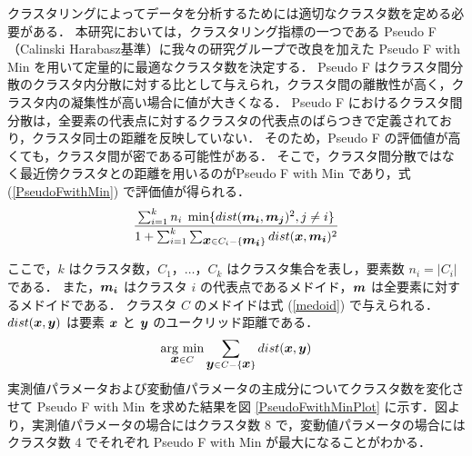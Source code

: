 \documentclass[technicalreport]{ieicej}
\begin{document}
クラスタリングによってデータを分析するためには適切なクラスタ数を定める必要がある．
本研究においては，クラスタリング指標の一つである Pseudo F（Calinski Harabasz基準）\cite{liu2010understanding}に我々の研究グループで改良を加えた Pseudo F with Min\cite{kanajiri} を用いて定量的に最適なクラスタ数を決定する．
Pseudo F はクラスタ間分散のクラスタ内分散に対する比として与えられ，クラスタ間の離散性が高く，クラスタ内の凝集性が高い場合に値が大きくなる．
Pseudo F におけるクラスタ間分散は，全要素の代表点に対するクラスタの代表点のばらつきで定義されており，クラスタ同士の距離を反映していない．
そのため，Pseudo F の評価値が高くても，クラスタ間が密である可能性がある．
そこで，クラスタ間分散ではなく最近傍クラスタとの距離を用いるのがPseudo F with Min であり，式 (\ref{PseudoFwithMin}) で評価値が得られる．
\begin{equation}
\frac{\sum^k_{i=1} n_{i}\hspace{0.1cm} \min \{ dist(\mbox{\boldmath $m_{i}$},\mbox{\boldmath $m_j$})^2,j \neq i \}}{1 + \sum^k_{i=1} \sum_{\mbox{\boldmath $x$} \in C_i - \{\mbox{\boldmath $m_i$}\}} dist(\mbox{\boldmath $x$},\mbox{\boldmath $m_{i}$})^2}
\label{PseudoFwithMin}
\end{equation}

ここで，$k$ はクラスタ数，$C_1，\ldots，C_k$ はクラスタ集合を表し，要素数 $n_i=|C_i|$ である．
また，$\mbox{\boldmath $m_i$}$ はクラスタ $i$ の代表点であるメドイド\cite{mouratidis2005medoid}，$\mbox{\boldmath $m$}$ は全要素に対するメドイドである．
クラスタ $C$ のメドイドは式 (\ref{medoid}) で与えられる．
$dist(\mbox{\boldmath $x$},\mbox{\boldmath $y$})$ は要素 $\mbox{\boldmath $x$}$ と $\mbox{\boldmath $y$}$ のユークリッド距離である．
\begin{equation}
\mathop{\rm arg~min}\limits_{\mbox{\boldmath $x$} \in C} \sum_{\mbox{\boldmath $y$} \in C - \{\mbox{\boldmath $x$}\}} dist(\mbox{\boldmath $x$},\mbox{\boldmath $y$})
\label{medoid}
\end{equation}
実測値パラメータおよび変動値パラメータの主成分についてクラスタ数を変化させて Pseudo F with Min を求めた結果を図 \ref{PseudoFwithMinPlot} に示す．図より，実測値パラメータの場合にはクラスタ数 8 で，変動値パラメータの場合にはクラスタ数 4 でそれぞれ Pseudo F with Min が最大になることがわかる．
\end{document}
